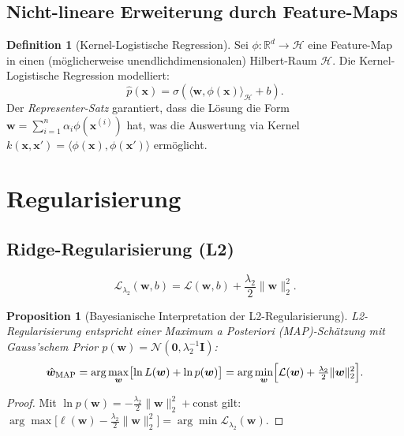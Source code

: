 ﻿\documentclass[12pt, a4paper]{article}
\newtheorem{proposition}[theorem]{Proposition}
\theoremstyle{definition}
\newtheorem{definition}[theorem]{Definition}
\theoremstyle{remark}
\newcommand{\R}{\mathbb{R}}
\newcommand{\sigmoid}{\sigma}
\newcommand{\vw}{\bm{w}}
\newcommand{\vx}{\bm{x}}
\begin{document}
\subsection{Nicht-lineare Erweiterung durch Feature-Maps}

\begin{definition}[Kernel-Logistische Regression]
  Sei $\phi: \R^d \to \mathcal{H}$ eine Feature-Map in einen (möglicherweise unendlichdimensionalen)
  Hilbert-Raum $\mathcal{H}$. Die Kernel-Logistische Regression modelliert:
  \[
    \hat{p}(\vx) = \sigmoid(\langle\vw, \phi(\vx)\rangle_{\mathcal{H}} + b).
  \]
  Der \emph{Representer-Satz} garantiert, dass die Lösung die Form
  $\vw = \sum_{i=1}^n \alpha_i \phi(\vx^{(i)})$ hat, was die Auswertung via Kernel
  $k(\vx, \vx') = \langle\phi(\vx),\phi(\vx')\rangle$ ermöglicht.
\end{definition}

\section{Regularisierung}

\subsection{Ridge-Regularisierung (L2)}

\begin{equation}
  \mathcal{L}_{\lambda_2}(\vw, b) = \mathcal{L}(\vw,b) + \frac{\lambda_2}{2}\|\vw\|_2^2.
  \label{eq:l2_loss}
\end{equation}

\begin{proposition}[Bayesianische Interpretation der L2-Regularisierung]
  L2-Regularisierung entspricht einer \emph{Maximum a Posteriori} (MAP)-Schätzung mit
  Gauss'schem Prior $p(\vw) = \mathcal{N}(\mathbf{0}, \lambda_2^{-1}\mathbf{I})$:
  \[
    \hat{\vw}_{\mathrm{MAP}} = \arg\max_{\vw} \bigl[\ln L(\vw) + \ln p(\vw)\bigr]
    = \arg\min_{\vw} \Bigl[\mathcal{L}(\vw) + \tfrac{\lambda_2}{2}\|\vw\|_2^2\Bigr].
  \]
\end{proposition}

\begin{proof}
  Mit $\ln p(\vw) = -\frac{\lambda_2}{2}\|\vw\|_2^2 + \mathrm{const}$ gilt:
  $\arg\max\bigl[\ell(\vw) - \frac{\lambda_2}{2}\|\vw\|_2^2\bigr] = \arg\min\mathcal{L}_{\lambda_2}(\vw)$. 
\end{proof}
\end{document}
